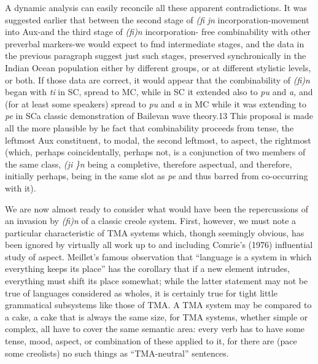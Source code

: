 A dynamic analysis can easily reconcile all these apparent contradictions. It was suggested earlier that between the second stage of \textit{(fi} \textit{jn} incorporation-movement into Aux-and the third stage of \textit{(fi)n} incorporation- free combinability with other preverbal markers-we would expect to fmd intermediate stages, and the data in the previous paragraph suggest just such stages, preserved synchronically in the Indian Ocean population either by different groups, or at different stylistic levels, or both. If those data are correct, it would appear that the combinability of \textit{(fi)n} began with \textit{ti} in SC, spread to MC, while in SC it extended also to \textit{pu} and \textit{a,} and (for at least some speak\-ers) spread to \textit{pu }and \textit{a} in MC while it was extending to \textit{pe }in SC\-a classic demonstration of Bailevan wave theory.13 This proposal is made all the more plausible by he fact that combinability proceeds from tense, the leftmost Aux constituent, to modal, the second left\-most, to aspect, the rightmost (which, perhaps coincidentally, perhaps
not, is a conjunction of two members of the same class, \textit{(}\textit{ji} \textit{\}n }being a completive, therefore aspectual, and therefore, initially perhaps, being in the same slot as \textit{pe }and thus barred from co-occurring with it).

We are now almost ready to consider what would have been the repercussions of an invasion by \textit{(fi)n} of a classic creole system. First, however, we must note a particular characteristic of TMA systems which, thongh seemingly obvious, has been ignored by virtually all work up to and including Comrie's (1976) influential study of aspect. Meillet's famous observation that ``language is a system in which every\-thing keeps its place'' has the corollary that if a new element intrudes, everything must shift its place somewhat; while the latter statement may not be true of languages considered as wholes, it is certainly true for tight little grammatical subsystems like those of TMA. A TMA system may be compared to a cake, a cake that is always the same size, for TMA systems, whether simple or complex, all have to cover the same semantic area: every verb has to have some tense, mood, aspect, or combination of these applied to it, for there are (pace some creolists) no such things as ``TMA-neutral'' sentences.


